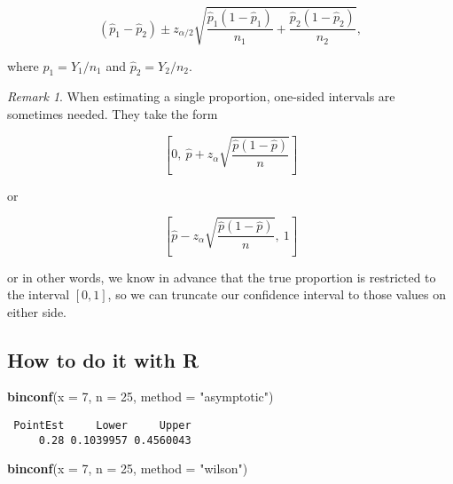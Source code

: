 \documentclass[]{book}
\newenvironment{Shaded}{\begin{snugshade}}{\end{snugshade}}
\newcommand{\KeywordTok}[1]{\textcolor[rgb]{0.13,0.29,0.53}{\textbf{{#1}}}}
\newcommand{\DataTypeTok}[1]{\textcolor[rgb]{0.13,0.29,0.53}{{#1}}}
\newcommand{\DecValTok}[1]{\textcolor[rgb]{0.00,0.00,0.81}{{#1}}}
\newcommand{\StringTok}[1]{\textcolor[rgb]{0.31,0.60,0.02}{{#1}}}
\newcommand{\NormalTok}[1]{{#1}}
\numberwithin{equation}{chapter}
\numberwithin{figure}{chapter}
\theoremstyle{plain}
\theoremstyle{definition}
\theoremstyle{remark}
\theoremstyle{definition}
\theoremstyle{definition}
\theoremstyle{remark}
\newtheorem*{remark}{Remark}
\begin{document}
\begin{equation}
\left(\hat{p}_{1}-\hat{p}_{2}\right)\pm z_{\alpha/2}\sqrt{\frac{\hat{p}_{1}(1-\hat{p}_{1})}{n_{1}}+\frac{\hat{p}_{2}(1-\hat{p}_{2})}{n_{2}}},
\end{equation}

where \(\hat{p}_{1}=Y_{1}/n_{1}\) and \(\hat{p}_{2}=Y_{2}/n_{2}\).

\bigskip

\begin{remark}
When estimating a single proportion, one-sided intervals are sometimes
needed. They take the form

\begin{equation}
\left[0,\ \hat{p}+z_{\alpha}\sqrt{\frac{\hat{p}(1-\hat{p})}{n}}\right]
\end{equation}

or

\begin{equation}
\left[\hat{p}-z_{\alpha}\sqrt{\frac{\hat{p}(1-\hat{p})}{n}},\ 1\right]
\end{equation}

or in other words, we know in advance that the true proportion is
restricted to the interval \([0,1]\), so we can truncate our confidence
interval to those values on either side.
\end{remark}

\subsection{How to do it with R}\label{how-to-do-it-with-r-36}

\begin{Shaded}
\begin{Highlighting}[]
\KeywordTok{binconf}\NormalTok{(}\DataTypeTok{x =} \DecValTok{7}\NormalTok{, }\DataTypeTok{n =} \DecValTok{25}\NormalTok{, }\DataTypeTok{method =} \StringTok{"asymptotic"}\NormalTok{)}
\end{Highlighting}
\end{Shaded}

\begin{verbatim}
 PointEst     Lower     Upper
     0.28 0.1039957 0.4560043
\end{verbatim}

\begin{Shaded}
\begin{Highlighting}[]
\KeywordTok{binconf}\NormalTok{(}\DataTypeTok{x =} \DecValTok{7}\NormalTok{, }\DataTypeTok{n =} \DecValTok{25}\NormalTok{, }\DataTypeTok{method =} \StringTok{"wilson"}\NormalTok{)}
\end{Highlighting}
\end{Shaded}
\end{document}
